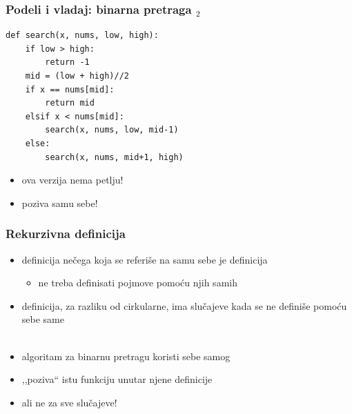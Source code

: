 \documentclass[utf8,compress]{beamer}
\begin{document}
\begin{frame}[fragile]
  \frametitle{Podeli i vladaj: binarna pretraga $_2$}
\begin{verbatim}
def search(x, nums, low, high):
    if low > high:
        return -1
    mid = (low + high)//2
    if x == nums[mid]:
        return mid
    elsif x < nums[mid]:
        search(x, nums, low, mid-1)
    else:
        search(x, nums, mid+1, high)
\end{verbatim}
  \begin{itemize}
    \item ova verzija nema petlju!
    \item poziva samu sebe!
  \end{itemize}
\end{frame}

\begin{frame}[fragile]
  \frametitle{Rekurzivna definicija}
  \begin{itemize}
    \item definicija nečega koja se referiše na samu sebe je  definicija
    \begin{itemize}
      \item ne treba definisati pojmove pomoću njih samih
    \end{itemize}
    \item {} definicija, za razliku od cirkularne, ima slučajeve kada 
      se ne definiše pomoću sebe same \\ \ \\
    \item algoritam za binarnu pretragu koristi sebe samog
    \item ,,poziva`` istu funkciju unutar njene definicije
    \item ali ne za sve slučajeve!
  \end{itemize}
\end{frame}
\end{document}
